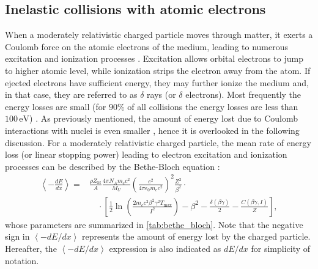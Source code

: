 \subsection{Inelastic collisions with atomic electrons}\label{ssec:bethe_bloch}
When a moderately relativistic charged particle moves through matter, it exerts a Coulomb force on the atomic electrons of the medium, leading to numerous excitation and ionization processes \cite{Christodoulides2016}. Excitation allows orbital electrons to jump to higher atomic level, while ionization strips the electron away from the atom. If ejected electrons have sufficient energy, they may further ionize the medium and, in that case, they are referred to as $\delta$ rays (or $\delta$ electrons). Most frequently the energy losses are small (for $90\%$ of all collisions the energy losses are less than $100\,\mathrm{eV}$) \cite{passageParticleMatter}. As previously mentioned, the amount of energy lost due to Coulomb interactions with nuclei is even smaller \cite{10.1063/1.369844}, hence it is overlooked in the following discussion. For a moderately relativistic charged particle, the mean rate of energy loss (or linear stopping power) leading to electron excitation and ionization processes can be described by the Bethe-Bloch equation \cite{KolanoskiBook}:
\begin{equation}
	\begin{split}
		\left\langle -\frac{dE}{dx} \right\rangle
		={}&
		\frac{\rho Z_\mathrm{M}}{A}
		\frac{4\pi N_A m_e c^2}{M_U}
		\left(\frac{e^2}{4\pi\epsilon_0 m_e c^2}\right)^2
		\frac{Z^2}{\beta^2}\cdot
		\\
		&\quad\cdot
		\left[
		\frac{1}{2}
		\ln\left(
		\frac{2m_e c^2\beta^2\gamma^2 T_\mathrm{max}}{I^2}
		\right)
		-\beta^2
		-\frac{\delta(\beta\gamma)}{2}
		-\frac{C(\beta\gamma,I)}{Z}
		\right],
	\end{split}
	\label{eq:bethe_bloch}
\end{equation}
whose parameters are summarized in \autoref{tab:bethe_bloch}. Note that the negative sign in $\left\langle-dE/dx \right\rangle$ represents the amount of energy lost by the charged particle. Hereafter, the $\left\langle-dE/dx \right\rangle$ expression is also indicated as $dE/dx$ for simplicity of notation.

